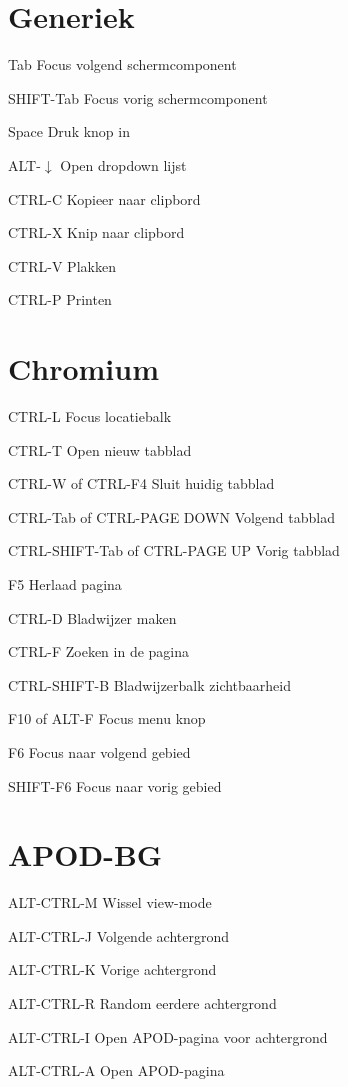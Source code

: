 \documentclass[10pt]{article}
\begin{document}
\begin{multicols}{3}
	\section{Generiek}
	\begin{ttdesc}[labelwidth=\widthof{\texttt{SHIFT+Tab}}]
	\item[Tab] Focus volgend schermcomponent
	\item[SHIFT-Tab] Focus vorig schermcomponent
	\item[Space] Druk knop in
	\item[ALT-$\downarrow$] Open dropdown lijst
	\item[CTRL-C] Kopieer naar clipbord
	\item[CTRL-X] Knip naar clipbord
	\item[CTRL-V] Plakken
	\item[CTRL-P] Printen
	\end{ttdesc}
	\section{Chromium}
	\begin{ttdesc}[labelwidth=\widthof{\texttt{CTRL+SHIFT-Tab}}]
	\item[CTRL-L] Focus locatiebalk
	\item[CTRL-T] Open nieuw tabblad
	\item[CTRL-W of CTRL-F4] Sluit huidig tabblad
	\item[CTRL-Tab of CTRL-PAGE DOWN] Volgend tabblad
	\item[CTRL-SHIFT-Tab of CTRL-PAGE UP] Vorig tabblad
	\item[F5] Herlaad pagina
	\item[CTRL-D] Bladwijzer maken
	\item[CTRL-F] Zoeken in de pagina
	\item[CTRL-SHIFT-B] Bladwijzerbalk zichtbaarheid
	\item[F10 of ALT-F] Focus menu knop
	\item[F6] Focus naar volgend gebied
	\item[SHIFT-F6] Focus naar vorig gebied
	\end{ttdesc}
	\section{APOD-BG}
	\begin{ttdesc}[labelwidth=\widthof{\texttt{WIN-SHIFT+E}}]
	\item[ALT-CTRL-M] Wissel view-mode
	\item[ALT-CTRL-J] Volgende achtergrond
	\item[ALT-CTRL-K] Vorige achtergrond
	\item[ALT-CTRL-R] Random eerdere achtergrond
	\item[ALT-CTRL-I] Open APOD-pagina voor achtergrond
	\item[ALT-CTRL-A] Open APOD-pagina
	\end{ttdesc}


\end{multicols}
\end{document}
